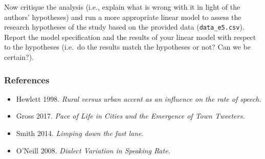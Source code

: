 \documentclass[
]{article}
\providecommand{\tightlist}{%
  \setlength{\itemsep}{0pt}\setlength{\parskip}{0pt}}
\begin{document}
Now critique the analysis (i.e., explain what is wrong with it in light
of the authors' hypotheses) and run a more appropriate linear model to
assess the research hypotheses of the study based on the provided data
(\texttt{data\_e5.csv}). Report the model specification and the results
of your linear model with respect to the hypotheses (i.e.~do the results
match the hypotheses or not? Can we be certain?).

\subsubsection{References}\label{references}

\begin{itemize}
\tightlist
\item
  Hewlett 1998. \emph{Rural versus urban accent as an influence on the
  rate of speech.}
\item
  Gross 2017. \emph{Pace of Life in Cities and the Emergence of Town
  Tweeters.}
\item
  Smith 2014. \emph{Limping down the fast lane.}
\item
  O'Neill 2008. \emph{Dialect Variation in Speaking Rate.}
\end{itemize}
\end{document}
